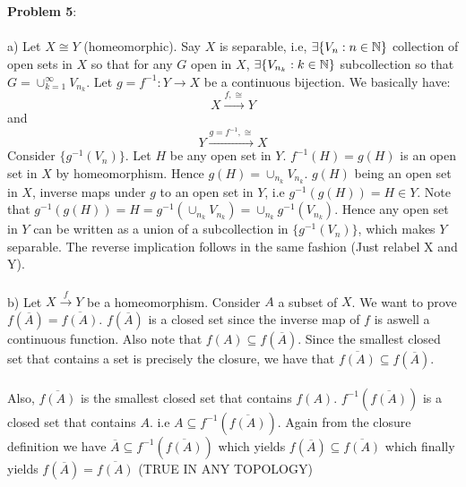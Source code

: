 \documentclass[../Main.tex]{subfiles}
\begin{document}
\\\\ \textbf{Problem 5}:
\\\\a) Let $X \cong Y$ (homeomorphic). Say $X$ is separable, i.e, $\exists \{V_n: n \in \mathbb N\}$ collection of open sets in $X$ so that for any $G$ open in $X$, $\exists \{V_{n_k}: k \in \mathbb N\}$ subcollection so that $G=\cup_{k=1}^{\infty} V_{n_k}$. Let $g=f^{-1}:Y \to X$ be a continuous bijection. We basically have: $$X\overset{f, \cong} \rightarrow Y $$ and $$Y \overset{g=f^{-1},\cong}\rightarrow X $$ Consider $\{g^{-1}(V_n)\}$. Let $H$ be any open set in $Y$. $f^{-1}(H)=g(H)$ is an open set in $X$ by homeomorphism. Hence $g(H)=\cup_{n_k}V_{n_k}$. $g(H)$ being an open set in $X$, inverse maps under $g$ to an open set in $Y$, i.e $g^{-1}(g(H))=H \in Y$. Note that $g^{-1}(g(H))=H=g^{-1}(\cup_{n_k}V_{n_k})=\cup_{n_k}g^{-1}(V_{n_k})$. Hence any open set in $Y$ can be written as a union of a subcollection in $\{g^{-1}(V_{n})\}$, which makes $Y$ separable. The reverse implication follows in the same fashion (Just relabel X and Y).
\\\\b) Let $X \overset{f}\rightarrow Y $ be a homeomorphism. Consider $A$ a subset of $X$. We want to prove $f(\overline{A})=\overline{f(A)}$. $f(\overline{A})$ is a closed set since the inverse map of $f$ is aswell a continuous function. Also note that $f(A) \subseteq f(\overline{A})$. Since the smallest closed set that contains a set is precisely the closure, we have that $\overline{f(A)}\subseteq f(\overline{A})$.
\\\\ Also, $\overline{f(A)}$ is the smallest closed set that contains $f(A)$. $f^{-1}(\overline{f(A)})$ is a closed set that contains $A$. i.e $A \subseteq f^{-1}(\overline{f(A)})$. Again from the closure definition we have $\overline{A} \subseteq f^{-1}(\overline{f(A)})$ which yields $f(\overline{A})\subseteq \overline{f(A)}$ which finally yields $f(\overline{A})=\overline{f(A)}$
(TRUE IN ANY TOPOLOGY)
\end{document}

